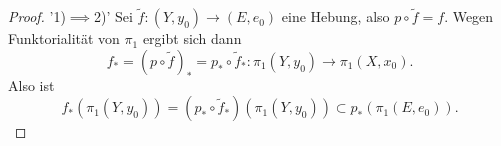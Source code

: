 \begin{proof}
    '1)$\implies$2)' Sei $\tilde{f}\colon (Y,y_0) \to  (E,e_0)$ eine Hebung, also $p \circ  \tilde{f} = f$. Wegen Funktorialität von $\pi_1$ ergibt sich dann
    \[
        f_* = (p \circ \tilde{f})_* = p_* \circ  \tilde{f}_*\colon  \pi_1(Y,y_0) \to  \pi_1(X,x_0)
    .\] 
    Also ist
    \[
        f_*(\pi_1(Y,y_0)) = (p_* \circ  \tilde{f}_*)(\pi_1(Y,y_0)) \subset p_*(\pi_1(E,e_0))
    .\] 
\end{proof}
